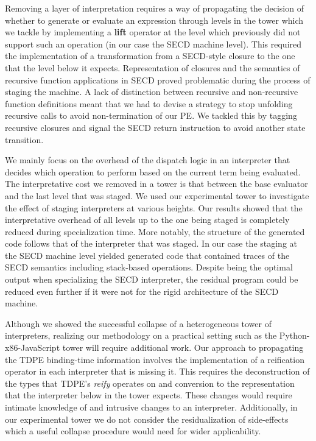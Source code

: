 \documentclass[a4paper,12pt,twoside,openright]{report}
\theoremstyle{definition}
\begin{document}
Removing a layer of interpretation requires a way of propagating the decision of whether to generate or evaluate an expression through levels in the tower which we tackle by implementing a \textbf{lift} operator at the level which previously did not support such an operation (in our case the SECD machine level). This required the implementation of a transformation from a SECD-style closure to the one that the level below it expects.
Representation of closures and the semantics of recursive function applications in SECD proved problematic during the process of staging the machine. A lack of distinction between recursive and non-recursive function definitions meant that we had to devise a strategy to stop unfolding recursive calls to avoid non-termination of our PE. We tackled this by tagging recursive closures and signal the SECD return instruction to avoid another state transition.

We mainly focus on the overhead of the dispatch logic in an interpreter that decides which operation to perform based on the current term being evaluated. The interpretative cost we removed in a tower is that between the base evaluator and the last level that was staged. We used our experimental tower to investigate the effect of staging interpreters at various heights. Our results showed that the interpretative overhead of all levels up to the one being staged is completely reduced during specialization time. More notably, the structure of the generated code follows that of the interpreter that was staged. In our case the staging at the SECD machine level yielded generated code that contained traces of the SECD semantics including stack-based operations. Despite being the optimal output when specializing the SECD interpreter, the residual program could be reduced even further if it were not for the rigid architecture of the SECD machine.

Although we showed the successful collapse of a heterogeneous tower of interpreters, realizing our methodology on a practical setting such as the Python-x86-JavaScript tower will require additional work. Our approach to propagating the TDPE binding-time information involves the implementation of a reification operator in each interpreter that is missing it. This requires the deconstruction of the types that TDPE's \textit{reify} operates on and conversion to the representation that the interpreter below in the tower expects. These changes would require intimate knowledge of and intrusive changes to an interpreter. Additionally, in our experimental tower we do not consider the residualization of side-effects which a useful collapse procedure would need for wider applicability.
\end{document}
